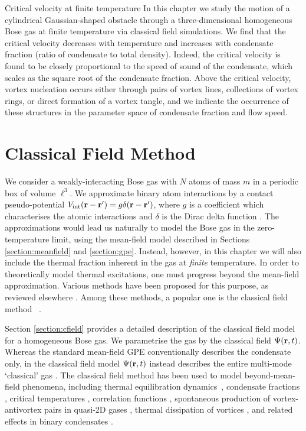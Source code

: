 \begin{chapter}{\label{cha:nonequib}Critical velocity at finite temperature}
In this chapter we study the motion of a cylindrical Gaussian-shaped
obstacle through a three-dimensional homogeneous Bose gas at finite
temperature via classical field simulations. We
find that the critical velocity decreases with temperature and
increases with condensate fraction (ratio of condensate to total density).
Indeed, the critical velocity is found to be closely proportional
to the speed of sound of the condensate, which scales as the square
root of the condensate fraction. Above
the critical velocity, vortex nucleation occurs either through
pairs of vortex lines, collections of vortex rings, or direct formation of a vortex tangle, and we indicate the occurrence of these structures in the parameter space of condensate fraction and flow speed.

  \section{Classical Field Method}
\label{sec:theory}

We consider a weakly-interacting Bose gas with $N$ atoms of mass $m$ in a periodic box of volume $\ell^3$.  We approximate binary atom interactions by a contact pseudo-potential $V_{\mathrm{int}}({\bf r}-{\bf r'})= g \delta({\bf r}-{\bf r'})$, where $g$ is a coefficient which characterises the atomic interactions and $\delta$ is the Dirac delta function \cite{Pethick}. The approximations would lead us naturally to model the Bose gas in the zero-temperature limit, using the mean-field model described in Sections \ref{section:meanfield} and \ref{section:gpe}. Instead, however, in this chapter we will also include the thermal fraction inherent in the gas at {\it finite} temperature. In order to theoretically model thermal excitations, one must progress beyond the mean-field approximation.
Various methods have been proposed for this purpose, as reviewed elsewhere
\cite{Pol_Rev,Proukakis,griffin2009bose,finite_temp_book,Blakie,berloff_2014}.
Among these methods, a popular one is the classical field method ~\cite{Svis5,Davis,PRL.87.210404,
PhysRevA.66.013603,Davis2,PhysRevLett.95.263901,Pol_Rev}.

Section \ref{section:cfield} provides a detailed description of the classical field model for a homogeneous Bose gas. We parametrise the gas by the classical field $\Psi({\bf r},t)$. Whereas the standard mean-field GPE conventionally describes the condensate only, in the classical field model $\Psi({\bf r},t)$ instead describes the entire multi-mode `classical' gas \cite{Proukakis,Blakie}.  The classical field method has been used to model beyond-mean-field phenomena, including thermal equilibration dynamics~\cite{PhysRevA.66.013603,PhysRevLett.95.263901,pattinson_2014,nazarenko_2014}, condensate fractions \cite{Davis}, critical temperatures \cite{Davis2006}, correlation functions \cite{Wright2011}, spontaneous production of vortex-antivortex pairs in quasi-2D gases \cite{Simula}, thermal dissipation of vortices \cite{berloff_2007},  and related effects in binary condensates \cite{Berloff_2006,Salman20091482,pattinson_2014}.


\end{chapter}
